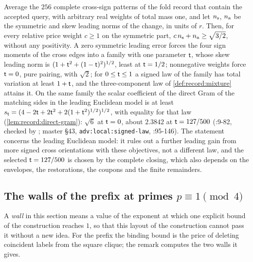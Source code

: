 \begin{remark}\label{rem:obs:sign-frontier}
Average the $256$ complete cross-sign patterns of the fold record that contain
the accepted query, with arbitrary real weights of total mass one, and let
$n_{\rm s}$, $n_{\rm a}$ be the symmetric and skew leading norms of the change, in
units of $r$. Then, for every relative price weight $c\ge1$ on the symmetric part, $c\,n_{\rm s}+n_{\rm a}\ge\sqrt{3/2}$, without
any positivity. A zero symmetric leading error forces the four sign moments of
the cross edges into a family with one parameter $\mathsf t$, whose skew leading
norm is $(1+\mathsf t^2+(1-\mathsf t)^2)^{1/2}$, least at $\mathsf t=1/2$; nonnegative weights
force $\mathsf t=0$, pure pairing, with $\sqrt2$; for $0\le\mathsf t\le1$ a signed law of the
family has total variation at least $1+\mathsf t$, and the three-component law of
\cref{def:record:mixture} attains it. On the same family the scalar coefficient of the direct Gram of the matching sides in the leading Euclidean model is at least
$s_\mathsf t=(4-2\mathsf t+2\mathsf t^2+2(1+\mathsf t^2)^{1/2})^{1/2}$, with equality for that law
(\cref{lem:record:direct-gram}): $\sqrt6$ at $\mathsf t=0$, about $2.3842$ at
$\mathsf t=127/500$
(:9-82, checked
by ; master
\S43, \texttt{adv:local:signed-law},
:95-146). The statement
concerns the leading Euclidean model: it rules out a further leading gain from
more signed cross orientations with these objectives, not a different law, and
the selected $\mathsf t=127/500$ is chosen by the complete closing, which also depends
on the envelopes, the restorations, the coupons and the finite remainders.
\end{remark}

\subsection{The walls of the prefix at primes \texorpdfstring{$p\equiv1\pmod4$}{p = 1 (mod 4)}}\label{subsec:obs:prefix}

A \emph{wall} in this section means a value of the exponent at
which one explicit bound of the construction reaches $1$, so that
this layout of the construction cannot pass it without a new idea.
For the prefix the binding bound is the price of deleting
coincident labels from the square clique; the remark computes the
two walls it gives.

